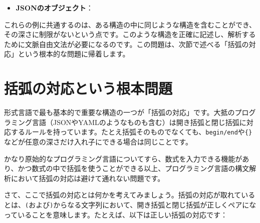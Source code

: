 \begin{Shaded}
\begin{Highlighting}[]
\end{Highlighting}
\end{Shaded}

\begin{itemize}
\tightlist
\item
  \textbf{JSONのオブジェクト}：
\end{itemize}

\begin{Shaded}
\begin{Highlighting}[]
\FunctionTok{\{}
  \FunctionTok{:} \FunctionTok{\{}
    \FunctionTok{:} \FunctionTok{\{}
      \FunctionTok{:} 
    \FunctionTok{\}}
  \FunctionTok{\}}
\FunctionTok{\}}
\end{Highlighting}
\end{Shaded}

これらの例に共通するのは、ある構造の中に同じような構造を含むことができ、その深さに制限がないという点です。このような構造を正確に記述し、解析するために文脈自由文法が必要になるのです。この問題は、次節で述べる「括弧の対応」という根本的な問題に帰着します。

\hypertarget{chapter4-ux62ecux5f27ux306eux5bfeux5fdcux3068ux3044ux3046ux6839ux672cux554fux984c}{%
\section{括弧の対応という根本問題}\label{chapter4-ux62ecux5f27ux306eux5bfeux5fdcux3068ux3044ux3046ux6839ux672cux554fux984c}}

形式言語で最も基本的で重要な構造の一つが「括弧の対応」です。大抵のプログラミング言語（JSONやYAMLのようなものも含む）は開き括弧と閉じ括弧に対応するルールを持っています。たとえ括弧そのものでなくても、\texttt{begin/end}や\texttt{\{\}}などが任意の深さだけ入れ子にできる場合は同じことです。

かなり原始的なプログラミング言語についてすら、数式を入力できる機能があり、かつ数式の中で括弧を使うことができる以上、プログラミング言語の構文解析において括弧の対応は避けて通れない問題です。

さて、ここで括弧の対応とは何かを考えてみましょう。括弧の対応が取れているとは、\texttt{(}および\texttt{)}からなる文字列において、開き括弧と閉じ括弧が正しくペアになっていることを意味します。たとえば、以下は正しい括弧の対応です：

